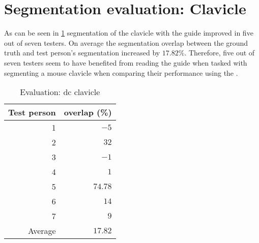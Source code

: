 \section{Segmentation evaluation: Clavicle}\label{s:seg-eval-clavicle}
As can be seen in \cref{tab:clavicle-overlap} segmentation of the clavicle with the guide improved in five out of seven testers.
On average the segmentation overlap between the ground truth and test person's segmentation increased by $17.82\%$.
Therefore, five out of seven testers seem to have benefited from reading the guide when tasked with segmenting a mouse clavicle when comparing their performance using the .
\begin{table}[ht]
	\begin{center}
		\begin{tabular}{r r}
			\textbf{Test person} & \textbf{overlap (\%)} \\
			\hline
			1                    & $-5$                  \\
			2                    & $32$                  \\
			3                    & $-1$                  \\
			4                    & $1$                   \\
			5                    & $74.78$               \\
			6                    & $14$                  \\
			7                    & $9$                   \\
			\hline
			Average              & $17.82$               \\
		\end{tabular}
		\caption{Evaluation: \acrshort{dc} clavicle}\label{tab:clavicle-overlap}
	\end{center}
\end{table}

